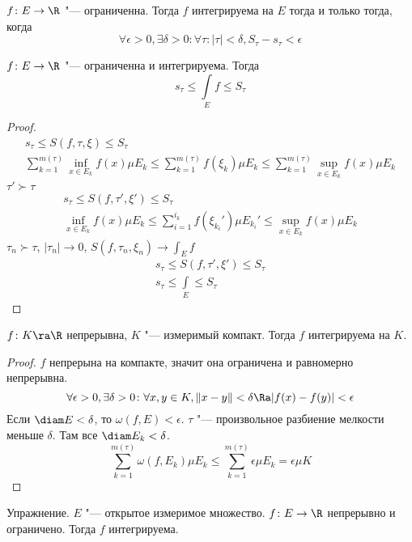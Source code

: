 \begin{theorem}
	$f\colon E \to \R$ "--- ограниченна.
	Тогда $f$ интегрируема на $E$ тогда и только тогда, когда
	\[ \forall \epsilon > 0, \exists \delta > 0\colon \forall \tau\colon |\tau| < \delta, S_\tau - s_\tau < \epsilon \]
\end{theorem}

\begin{conseq}
	$f\colon E \to \R$ "--- ограниченна и интегрируема.
	Тогда
	\[ s_\tau \le \int\limits_E f \le S_\tau \]
\end{conseq}
\begin{proof}
	\begin{gather*}
		s_\tau \le S(f, \tau, \xi) \le S_\tau \\
		\sum_{k=1}^{m(\tau)} \inf_{x \in E_k} f(x) \mu E_k
			\le \sum_{k=1}^{m(\tau)} f(\xi_k) \mu E_k
			\le \sum_{k=1}^{m(\tau)} \sup_{x \in E_k} f(x) \mu E_k
	\end{gather*}
	$\tau' \succ \tau$
	\begin{gather*}
		s_\tau \le S(f, \tau', \xi') \le S_\tau \\
		\inf_{x \in E_k} f(x) \mu E_k
			\le \sum_{i=1}^{i_k} f(\xi_{k_i}') \mu E_{k_i}'
			\le \sup_{x \in E_k} f(x) \mu E_k
	\end{gather*}
	$\tau_n \succ \tau$, $|\tau_n| \to 0$, $S(f, \tau_n, \xi_n) \to \int_E f$
	\begin{gather*}
		s_\tau \le S(f, \tau', \xi') \le S_\tau \\
		s_\tau \le \int\limits_E \le S_\tau
	\end{gather*}
\end{proof}

\begin{theorem}
	$f\colon K \ra \R$ непрерывна, $K$ "--- измеримый компакт.
	Тогда $f$ интегрируема на $K$.
\end{theorem}
\begin{proof}
	$f$ непрерына на компакте, значит она ограничена и равномерно непрерывна.
	\[ \forall \epsilon > 0, \exists \delta > 0\colon \forall x,y\in K, \|x - y\| < \delta \Ra |f(x) - f(y)| < \epsilon \]
	Если $\diam E < \delta$, то $\omega(f, E) < \epsilon$.
	$\tau$ "--- произвольное разбиение мелкости меньше $\delta$. Там все $\diam E_k < \delta$.
	\[ \sum_{k=1}^{m(\tau)} \omega(f, E_k) \mu E_k \le \sum_{k=1}^{m(\tau)} \epsilon \mu E_k = \epsilon \mu K \]
\end{proof}

Упражнение. $E$ "--- открытое измеримое множество.
$f\colon E \to \R$ непрерывно и ограничено.
Тогда $f$ интегрируема.

